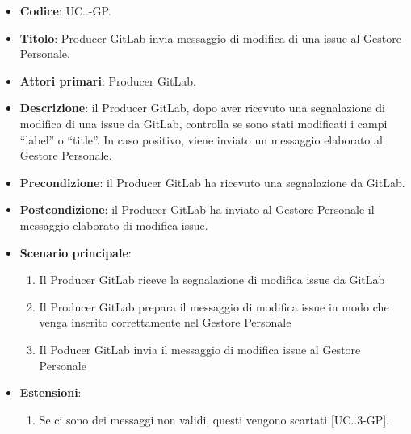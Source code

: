 			\begin{itemize}
				\item \textbf{Codice}: UC\theuccount.\thesubuccount.\thesubsubuccount-GP.
				\item \textbf{Titolo}: Producer GitLab invia messaggio di modifica di una issue al Gestore Personale.
				\item \textbf{Attori primari}: Producer GitLab.
				\item \textbf{Descrizione}: il Producer GitLab, dopo aver ricevuto una segnalazione di modifica di una issue da GitLab, controlla se sono stati modificati i campi ``label'' o ``title''.
				In caso positivo, viene inviato un messaggio elaborato al Gestore Personale.
				\item \textbf{Precondizione}: il Producer GitLab ha ricevuto una segnalazione da GitLab.
				\item \textbf{Postcondizione}: il Producer GitLab ha inviato al Gestore Personale il messaggio   \newline elaborato di modifica issue.
				\item \textbf{Scenario principale}: 
				\begin{enumerate}
					\item Il Producer GitLab riceve la segnalazione di modifica issue da GitLab
					\item Il Producer GitLab prepara il messaggio di modifica issue in modo che venga inserito correttamente nel Gestore Personale
					\item Il Poducer GitLab invia il messaggio di modifica issue al Gestore Personale
				\end{enumerate}
				\item \textbf{Estensioni}: 
				\begin{enumerate}
					\item Se ci sono dei messaggi non validi, questi vengono scartati [UC\theuccount.\thesubuccount.3-GP].
				\end{enumerate}
			\end{itemize}
		
